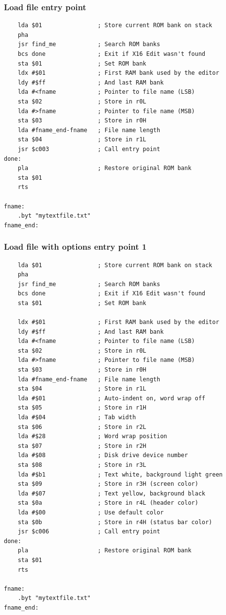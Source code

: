 \documentclass{article}
\begin{document}
    \subsubsection{Load file entry point}
\begin{verbatim}
    lda $01                ; Store current ROM bank on stack
    pha
    jsr find_me            ; Search ROM banks
    bcs done               ; Exit if X16 Edit wasn't found
    sta $01                ; Set ROM bank  
    ldx #$01               ; First RAM bank used by the editor
    ldy #$ff               ; And last RAM bank
    lda #<fname            ; Pointer to file name (LSB)
    sta $02                ; Store in r0L
    lda #>fname            ; Pointer to file name (MSB)
    sta $03                ; Store in r0H
    lda #fname_end-fname   ; File name length
    sta $04                ; Store in r1L
    jsr $c003              ; Call entry point
done:
    pla                    ; Restore original ROM bank
    sta $01
    rts

fname:
    .byt "mytextfile.txt"
fname_end:
\end{verbatim}

    \subsubsection{Load file with options entry point 1}
\begin{verbatim}
    lda $01                ; Store current ROM bank on stack
    pha
    jsr find_me            ; Search ROM banks
    bcs done               ; Exit if X16 Edit wasn't found
    sta $01                ; Set ROM bank
    
    ldx #$01               ; First RAM bank used by the editor
    ldy #$ff               ; And last RAM bank
    lda #<fname            ; Pointer to file name (LSB)
    sta $02                ; Store in r0L
    lda #>fname            ; Pointer to file name (MSB)
    sta $03                ; Store in r0H
    lda #fname_end-fname   ; File name length
    sta $04                ; Store in r1L
    lda #$01               ; Auto-indent on, word wrap off
    sta $05                ; Store in r1H
    lda #$04               ; Tab width
    sta $06                ; Store in r2L
    lda #$28               ; Word wrap position
    sta $07                ; Store in r2H
    lda #$08               ; Disk drive device number
    sta $08                ; Store in r3L
    lda #$b1               ; Text white, background light green
    sta $09                ; Store in r3H (screen color)
    lda #$07               ; Text yellow, background black
    sta $0a                ; Store in r4L (header color)
    lda #$00               ; Use default color
    sta $0b                ; Store in r4H (status bar color)
    jsr $c006              ; Call entry point
done:
    pla                    ; Restore original ROM bank
    sta $01
    rts
   
fname:
    .byt "mytextfile.txt"
fname_end:
\end{verbatim}
\end{document}

